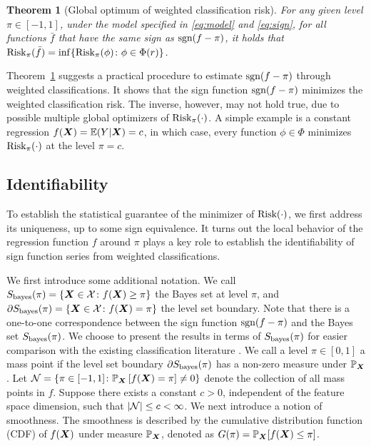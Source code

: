 \documentclass[aos]{imsart}
\newtheorem{theorem}{Theorem}%
\theoremstyle{definition}
\def\sign{\textup{sgn}}
\def\risk{\textup{Risk}}
\def\bayesS{S_{\textup{bayes}}}
\begin{document}
\begin{theorem}[Global optimum of weighted classification risk]\label{thm:oracle} For any given level $\pi\in[-1,1]$, under the model specified in \eqref{eq:model} and \eqref{eq:sign}, for all functions $\bar f$ that have the same sign as $\sign(f-\pi)$, it holds that $\risk_\pi(\bar f) = \inf\{\risk_\pi(\phi)\colon \phi\in \Phi(r)\}$. 
\end{theorem}

\noindent
Theorem~\ref{thm:oracle} suggests a practical procedure to estimate $\sign(f-\pi)$ through weighted classifications. It shows that the sign function $\sign(f-\pi)$ minimizes the weighted classification risk. The inverse, however, may not hold true, due to possible multiple global optimizers of $\risk_\pi(\cdot)$. A simple example is a constant regression $f(\bm X)=\mathbb{E}(Y|\bm X) = c$, in which case, every function $\phi\in \Phi$ minimizes $\risk_\pi(\cdot)$ at the level $\pi=c$. 



\subsection{Identifiability}

To establish the statistical guarantee of the minimizer of $\risk(\cdot)$, we first address its uniqueness, up to some sign equivalence. It turns out the local behavior of the regression function $f$ around $\pi$ plays a key role to establish the identifiability of sign function series from weighted classifications.

We first introduce some additional notation. We call $\bayesS(\pi)=\{\mX\in\tX\colon f(\mX)\geq \pi\}$ the Bayes set at level $\pi$, and $\partial \bayesS(\pi)=\{\mX\in \tX\colon f(\mX)=\pi\}$ the level set boundary. Note that there is a one-to-one correspondence between the sign function $\sign(f-\pi)$ and the Bayes set $\bayesS(\pi)$. We choose to present the results in terms of $\bayesS(\pi)$ for easier comparison with the existing classification literature \citep{tsybakov2004optimal,singh2009adaptive}. We call a level $\pi\in[0,1]$ a mass point if the level set boundary $\partial \bayesS(\pi)$ has a non-zero measure under $\mathbb{P}_{\bm X}$. Let $\mathcal{N}=\{\pi\in[-1,1] \colon \mathbb{P}_{\bm X}\left[f(\bm X)=\pi\right]\neq 0\}$ denote the collection of all mass points in $f$. Suppose there exists a constant $c>0$, independent of the feature space dimension, such that $|\mathcal{N}|\leq c<\infty$. 
We next introduce a notion of smoothness. The smoothness is described by the cumulative distribution function (CDF) of $f(\bm X)$ under measure $ \mathbb{P}_{\bm X}$, denoted as $G(\pi)=\mathbb{P}_{\bm X}[f(\bm X)\leq \pi]$.
\end{document}
